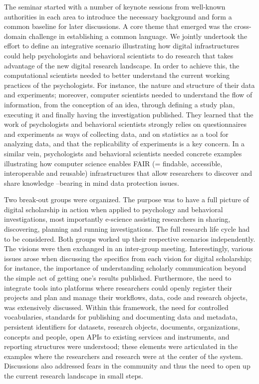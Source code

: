 \documentclass[a4paper,UKenglish]{dagrep}
\begin{document}
The seminar started with a number of keynote sessions from well-known
authorities in each area to introduce the necessary background and form a common
baseline for later discussions. A core theme that emerged was the cross-domain
challenge in establishing a common language.  We jointly undertook the effort to
define an integrative scenario illustrating how digital infrastructures could
help psychologists and behavioral scientists to do research that takes advantage
of the new digital research landscape. In order to achieve this, the
computational scientists needed to better understand the current working
practices of the psychologists. For instance, the nature and structure of their
data and experiments; moreover, computer scientists needed to understand the
flow of information, from the conception of an idea, through defining a study
plan, executing it and finally having the investigation published. They learned
that the work of psychologists and behavioral scientists strongly relies on
questionnaires and experiments as ways of collecting data, and on statistics as
a tool for analyzing data, and that the replicability of experiments is a key
concern. In a similar vein, psychologists and behavioral scientists needed
concrete examples illustrating how computer science enables FAIR (= findable,
accessible, interoperable and reusable) infrastructures that allow researchers
to discover and share knowledge --bearing in mind data protection issues. 

Two break-out groups were organized. The purpose was to have a full picture of
digital scholarship in action when applied to psychology and behavioral
investigations, most importantly e-science assisting researchers in sharing,
discovering, planning and running investigations. The full research life cycle
had to be considered. Both groups worked up their respective scenarios
independently. The visions were then exchanged in an inter-group meeting.
Interestingly, various issues arose when discussing the specifics from each
vision for digital scholarship; for instance, the importance of understanding
scholarly communication beyond the simple act of getting one's results
published. Furthermore, the need to integrate tools into platforms where
researchers could openly register their projects and plan and manage their
workflows, data, code and research objects, was extensively discussed. Within
this framework, the need for controlled vocabularies, standards for publishing
and documenting data and metadata, persistent identifiers for datasets, research
objects, documents, organizations, concepts and people, open APIs to existing
services and instruments, and reporting structures were understood; these
elements were articulated in the examples where the researchers and research
were at the center of the system. Discussions also addressed fears in the
community and thus the need to open up the current research landscape in small
steps.
\end{document}
